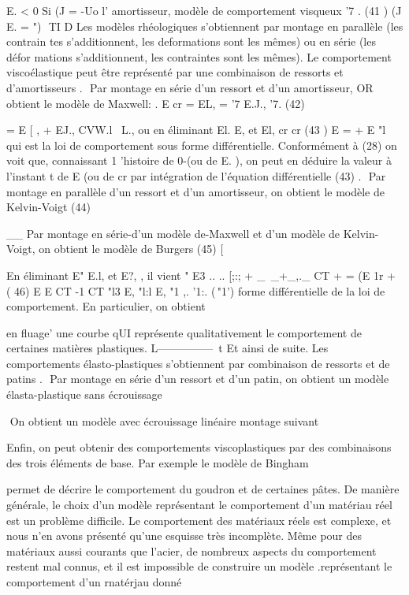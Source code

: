 E. < 0 Si (J = -Uo 
l' amortisseur, modèle de comportement visqueux 
'7
. 
(41 ) (J E.
= ")  TI D 
Les modèles rhéologiques s'obtiennent par montage en parallèle (les contrain­
tes s'additionnent, les deformations sont les mêmes) ou en série (les défor­
mations s'additionnent, les contraintes sont les mêmes). 
Le comportement viscoélastique peut être représenté par une combi­naison de ressorts et d'amortisseurs . 
 Par montage en série d'un ressort et d'un amortisseur, OR obtient le modèle de Maxwell: 
. 
E
cr = EL, = '7 E.J., '7. 
(42) 
{ = E
[ , + EJ., 
CVW.l~ 
L.,
ou en éliminant El.
E, et El, 
cr cr
(43 ) E 
= + 
E 
"l 
qui est la loi de comportement sous forme différentielle. Conformément à (28) 
on voit que, connaissant 1 'histoire de 0-(ou de E. ), on peut en déduire la valeur à l'instant t de E (ou de cr par intégration de l'équation dif­férentielle (43) . 
 Par montage en parallèle d'un ressort et d'un amortisseur, on obtient le 
modèle de Kelvin-Voigt 
(44) 


__ Par montage en série-d'un modèle de-Maxwell et d'un modèle de Kelvin-Voigt, on obtient le modèle de Burgers 
(45) 
[ 


En éliminant E" E.l, et E?, , il vient 
" E3 .. .. [;:;
+ _~_+_,._ CT
+ = (E 1r +
( 46) E E CT -1 CT 
"l3 E, "l:l E, "1 ,. '1:. (\,"1') 
forme différentielle de la loi de comportement. En particulier, on obtient 


en fluage' une courbe qUI représente qualitativement le comportement de certaines matières plastiques. 
L---------------~t 
Et ainsi de suite. 
Les comportements élasto-plastiques s'obtiennent par combinaison de ressorts et de patins . 
 Par montage en série d'un ressort et d'un patin, on obtient un modèle 
élasta-plastique sans écrouissage 


 On obtient un modèle avec écrouissage linéaire montage suivant 

Enfin, on peut obtenir des comportements viscoplastiques par des combinaisons des trois éléments de base. Par exemple le modèle de Bingham 

permet de décrire le comportement du goudron et de certaines pâtes. 
De manière générale, le choix d'un modèle représentant le compor­tement d'un matériau réel est un problème difficile. Le comportement des matériaux réels est complexe, et nous n'en avons présenté qu'une esquisse 
très  incomplète.  Même  pour  des  matériaux aussi  courants  que  l'acier,  de  
nombreux  aspects  du  comportement  restent mal  connus,  et  il  est  impossible  
de  construire  un  modèle .représentant  le comportement  d'un rnatérjau donné  

}
